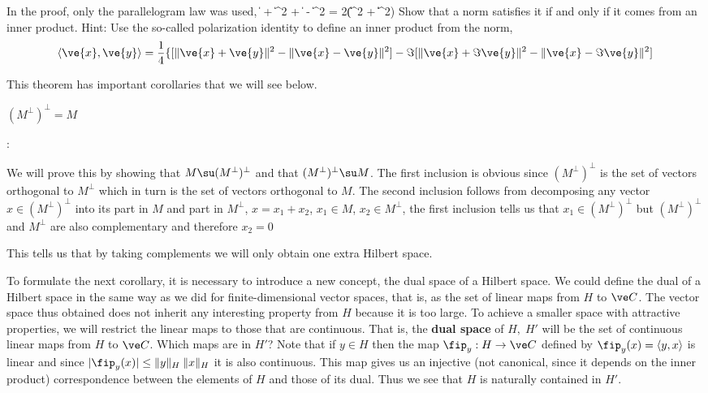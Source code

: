 \bpro 
In the proof, only the parallelogram law was used,
\beq
\label{paralelogramo}
\| + \|^2 + \| - \|^2  = 
                     2(\|\|^2 + \|\|^2) 
\eeq
%
Show that a norm satisfies it if and only if it comes from an
inner product. 
Hint: Use the so-called polarization identity to define an 
inner product from the norm,
\begin{equation}
  \label{eq:polarizacion}
  \langle\ve{x}, \ve{y}\rangle = \frac{1}{4}\{
               [\|\ve{x} + \ve{y}\|^2 - \|\ve{x} - \ve{y}\|^2]
              -\Im [\|\ve{x} + \Im \ve{y}\|^2 - \|\ve{x} - \Im \ve{y}\|^2]
\end{equation}
\epro

This theorem has important corollaries that we will see below.

\bcor 
$(M^{\perp})^{\perp}=M$
\ecor

\pru:

We will prove this by showing that $M\su (M^{\perp})^{\perp}$ and that 
$(M^{\perp})^{\perp}\su M$.
The first inclusion is obvious since $(M^{\perp})^{\perp}$ 
is the set of vectors orthogonal
to $M^{\perp}$ which in turn is the set of vectors orthogonal to $M$.
The second inclusion follows from decomposing any vector
$x\in (M^{\perp})^{\perp}$ into its part in $M$ and part in $M^{\perp}$, $
x=x_1+x_2$, $x_1\in M$, $x_2\in M^{\perp}$,  
the first inclusion tells us that $x_1\in(M^{\perp})^{\perp}$ but
$(M^{\perp})^{\perp}$ and $M^{\perp}$ are also
complementary and therefore $x_2=0$ 
\epru

This tells us that by taking complements we will only obtain
one extra Hilbert space.

To formulate the next corollary, it is necessary to introduce a new
concept, the dual space of a Hilbert space. We could
define the dual of a Hilbert space in the same way as we
did for finite-dimensional vector spaces, that is, as
the set of linear maps from $H$ to $\ve C$. The vector space thus
obtained does not inherit any interesting property from $H$ because it is too large.
To achieve a smaller space with attractive properties,
we will restrict the linear maps to those that are continuous. 
That is,
the {\bf dual space} of $H,\;H'$ will be the set of continuous linear maps 
from $H$ to $\ve C$. 
Which maps are in $H'$? 
Note that if $y\in H$ then the map $\fip_y:H\to \ve C$ 
defined by $\fip_y(x)=\langle y,x\rangle$ is linear and since $|\fip_y(x)|\leq\|y\|_H\:\|x\|_H$
it is also continuous. This map gives us an injective 
(not canonical, since it depends on the inner product) correspondence between the
elements of $H$ and those of its dual.
Thus we see that $H$ is naturally contained in $H'$.


